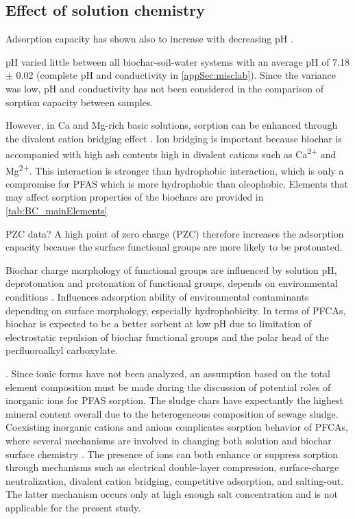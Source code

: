 \subsection{Effect of solution chemistry}\label{sec:inorganic}
Adsorption capacity has shown also to increase with decreasing pH \citep{zhang2013sorption}. 

pH varied little between all biochar-soil-water systems with an average pH of 7.18 $\pm$ 0.02 (complete pH and conductivity in \cref{appSec:misclab}). Since the variance was low, pH and conductivity has not been considered in the comparison of sorption capacity between samples. 

However, in Ca and Mg-rich basic solutions, sorption can be enhanced through the divalent cation bridging effect \citep{sigmund2022sorption}.  Ion bridging is important because biochar is accompanied with high ash contents high in divalent cations such as Ca\textsuperscript{2+} and Mg\textsuperscript{2+}. This interaction is stronger than hydrophobic interaction, which is only a compromise for PFAS which is more hydrophobic than oleophobic. Elements that may affect sorption properties of the biochars are provided in \cref{tab:BC_mainElements}

PZC data? A high point of zero charge (PZC) therefore increases the adsorption capacity because the surface functional groups are more likely to be protonated.


 

Biochar charge morphology of functional groups are influenced by solution pH, deprotonation and protonation of functional groups, depends on environmental conditions \citep{Li2019}. Influences adsorption ability of environmental contaminants depending on surface morphology, especially hydrophobicity. In terms of PFCAs, biochar is expected to be a better sorbent at low pH due to limitation of electrostatic repulsion of biochar functional groups and the polar head of the perfluoroalkyl carboxylate. 

. Since ionic forms have not been analyzed, an assumption based on the total element composition must be made during the discussion of potential roles of inorganic ions for PFAS sorption. The sludge chars have expectantly the highest mineral content overall due to the heterogeneous composition of sewage sludge. 
Coexisting inorganic cations and anions complicates sorption behavior of PFCAs, where several mechanisms are involved in changing both solution and biochar surface chemistry \citep{du2014adsorption}. The presence of ions can both enhance or suppress sorption through mechanisms such as electrical double-layer compression, surface-charge neutralization, divalent cation bridging, competitive adsorption, and salting-out. The latter mechanism occurs only at high enough salt concentration and is not applicable for the present study. 

